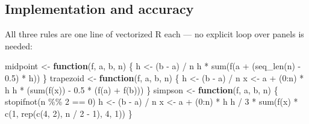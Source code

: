 \documentclass[
  letterpaper,
  DIV=11,
  numbers=noendperiod]{scrreprt}
\newenvironment{Shaded}{\begin{snugshade}}{\end{snugshade}}
\newcommand{\ControlFlowTok}[1]{\textcolor[rgb]{0.00,0.23,0.31}{\textbf{#1}}}
\newcommand{\DecValTok}[1]{\textcolor[rgb]{0.68,0.00,0.00}{#1}}
\newcommand{\FloatTok}[1]{\textcolor[rgb]{0.68,0.00,0.00}{#1}}
\newcommand{\FunctionTok}[1]{\textcolor[rgb]{0.28,0.35,0.67}{#1}}
\newcommand{\NormalTok}[1]{\textcolor[rgb]{0.00,0.23,0.31}{#1}}
\newcommand{\OtherTok}[1]{\textcolor[rgb]{0.00,0.23,0.31}{#1}}
\newcommand{\SpecialCharTok}[1]{\textcolor[rgb]{0.37,0.37,0.37}{#1}}
\begin{document}
\subsection{Implementation and
accuracy}\label{implementation-and-accuracy}

All three rules are one line of vectorized R each --- no explicit loop
over panels is needed:

\begin{Shaded}
\begin{Highlighting}[]
\NormalTok{midpoint  }\OtherTok{\textless{}{-}} \ControlFlowTok{function}\NormalTok{(f, a, b, n) \{}
\NormalTok{    h }\OtherTok{\textless{}{-}}\NormalTok{ (b }\SpecialCharTok{{-}}\NormalTok{ a) }\SpecialCharTok{/}\NormalTok{ n}
\NormalTok{    h }\SpecialCharTok{*} \FunctionTok{sum}\NormalTok{(}\FunctionTok{f}\NormalTok{(a }\SpecialCharTok{+}\NormalTok{ (}\FunctionTok{seq\_len}\NormalTok{(n) }\SpecialCharTok{{-}} \FloatTok{0.5}\NormalTok{) }\SpecialCharTok{*}\NormalTok{ h))}
\NormalTok{\}}
\NormalTok{trapezoid }\OtherTok{\textless{}{-}} \ControlFlowTok{function}\NormalTok{(f, a, b, n) \{}
\NormalTok{    h }\OtherTok{\textless{}{-}}\NormalTok{ (b }\SpecialCharTok{{-}}\NormalTok{ a) }\SpecialCharTok{/}\NormalTok{ n}
\NormalTok{    x }\OtherTok{\textless{}{-}}\NormalTok{ a }\SpecialCharTok{+}\NormalTok{ (}\DecValTok{0}\SpecialCharTok{:}\NormalTok{n) }\SpecialCharTok{*}\NormalTok{ h}
\NormalTok{    h }\SpecialCharTok{*}\NormalTok{ (}\FunctionTok{sum}\NormalTok{(}\FunctionTok{f}\NormalTok{(x)) }\SpecialCharTok{{-}} \FloatTok{0.5} \SpecialCharTok{*}\NormalTok{ (}\FunctionTok{f}\NormalTok{(a) }\SpecialCharTok{+} \FunctionTok{f}\NormalTok{(b)))}
\NormalTok{\}}
\NormalTok{simpson   }\OtherTok{\textless{}{-}} \ControlFlowTok{function}\NormalTok{(f, a, b, n) \{}
    \FunctionTok{stopifnot}\NormalTok{(n }\SpecialCharTok{\%\%} \DecValTok{2} \SpecialCharTok{==} \DecValTok{0}\NormalTok{)}
\NormalTok{    h }\OtherTok{\textless{}{-}}\NormalTok{ (b }\SpecialCharTok{{-}}\NormalTok{ a) }\SpecialCharTok{/}\NormalTok{ n}
\NormalTok{    x }\OtherTok{\textless{}{-}}\NormalTok{ a }\SpecialCharTok{+}\NormalTok{ (}\DecValTok{0}\SpecialCharTok{:}\NormalTok{n) }\SpecialCharTok{*}\NormalTok{ h}
\NormalTok{    h }\SpecialCharTok{/} \DecValTok{3} \SpecialCharTok{*} \FunctionTok{sum}\NormalTok{(}\FunctionTok{f}\NormalTok{(x) }\SpecialCharTok{*} \FunctionTok{c}\NormalTok{(}\DecValTok{1}\NormalTok{, }\FunctionTok{rep}\NormalTok{(}\FunctionTok{c}\NormalTok{(}\DecValTok{4}\NormalTok{, }\DecValTok{2}\NormalTok{), n }\SpecialCharTok{/} \DecValTok{2} \SpecialCharTok{{-}} \DecValTok{1}\NormalTok{), }\DecValTok{4}\NormalTok{, }\DecValTok{1}\NormalTok{))}
\NormalTok{\}}
\end{Highlighting}
\end{Shaded}
\end{document}
